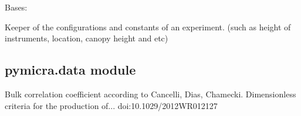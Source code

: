 \documentclass[a4paper,10pt,english]{sphinxmanual}
\begin{document}

\begin{fulllineitems}
\label{pymicra:pymicra.core.siteConfig}
Bases: 

Keeper of the configurations and constants of an experiment. (such as height of instruments,
location, canopy height and etc)

\end{fulllineitems}



\subsection{pymicra.data module}
\label{pymicra:pymicra-data-module}\label{pymicra:module-pymicra.data}

\begin{fulllineitems}
\label{pymicra:pymicra.data.bulkCorr}
Bulk correlation coefficient according to
Cancelli, Dias, Chamecki. Dimensionless criteria for the production of...
doi:10.1029/2012WR012127

\end{fulllineitems}

\end{document}
